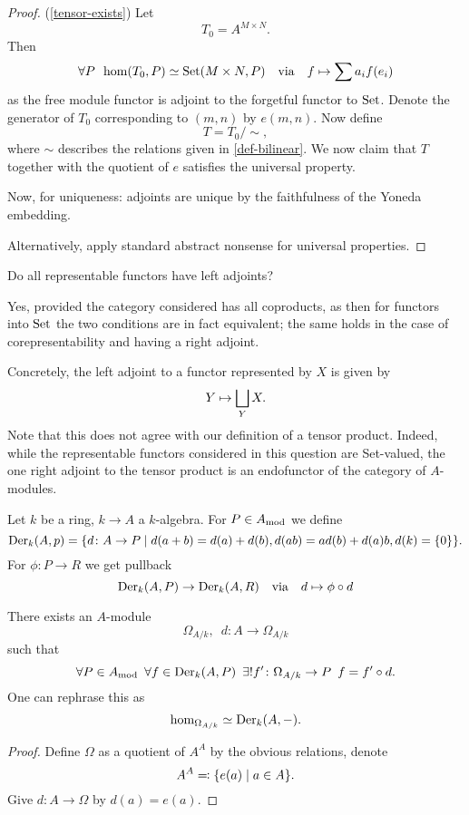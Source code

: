\begin{proof}(\cref{tensor-exists})
  Let
  \[ T_0 = A^{M \times N}.\]
  Then
  \[ \forall P \enspace \hom(T_0, P) \simeq \text{Set}(M \times N, P) \quad \text{via} \quad  f \mapsto \sum a_i f(e_i)\]
  as the free module functor is adjoint to the forgetful functor to $\text{Set}$.
  Denote the generator of $T_0$ corresponding to $(m, n)$ by $e(m, n)$. Now define
  \[ T = T_0 / {\sim}, \]
  where $\sim$ describes the relations given in \cref{def-bilinear}.
  We now claim that $T$ together with the quotient of $e$ satisfies the universal property.


  Now, for uniqueness: adjoints are unique by the faithfulness of the Yoneda embedding.

  Alternatively, apply standard abstract nonsense for universal properties.
\end{proof}

\begin{question}
  Do all representable functors have left adjoints?
\end{question}
\begin{answer}
  Yes, provided the category considered has all coproducts, as then for functors into $\text{Set}$ the two conditions are in fact equivalent; the same holds in the case of corepresentability and having a right adjoint.

  Concretely, the left adjoint to a functor represented by $X$ is given by
  \[ Y \mapsto \bigsqcup_Y X.\]
  Note that this does not agree with our definition of a tensor product. Indeed, while the representable functors considered in this question are Set-valued, the one right adjoint to the tensor product is an endofunctor of the category of $A$-modules.
\end{answer}

\begin{df}
  Let $k$ be a ring,  $k \to A$ a $k$-algebra. For $P \in A_\text{mod}$ we define
  \[ \operatorname{Der}_k(A, p) = \{ d \colon A \to P \mathrel{|} d(a+b) = d(a) + d(b), d(ab) = a d(b) + d(a) b, d(k) = \{0\} \}.\]
  For $\phi \colon P \to R$ we get pullback
  \[ \operatorname{Der}_k(A, P) \to \operatorname{Der}_k(A, R) \quad \text{via} \quad d \mapsto \phi \circ d\]
\end{df}

\begin{theorem}
  There exists an $A$-module
  \[ \Omega_{A / {k}}, \enspace d \colon A \to \Omega_{A /{k}}\]
  such that
  \[ \forall P \in A_\text{mod} \enspace \forall f \in \operatorname{Der}_k(A, P) \enspace \exists \text{!} f' \colon \Omega_{A /{k}} \to P \enspace f = f' \circ d.\]
  One can rephrase this as
  \[ \hom_{\Omega_{A/{k}}} \simeq \operatorname{Der}_k(A, -).\]
\end{theorem}
\begin{proof}
  Define $\Omega$ as a quotient of $A^A$ by the obvious relations, denote
  \[ A^A \eqqcolon \{e(a) \mathrel{|} a \in A \}.\]
  Give $d \colon A \to \Omega$ by $d(a) = e(a)$.
\end{proof}

